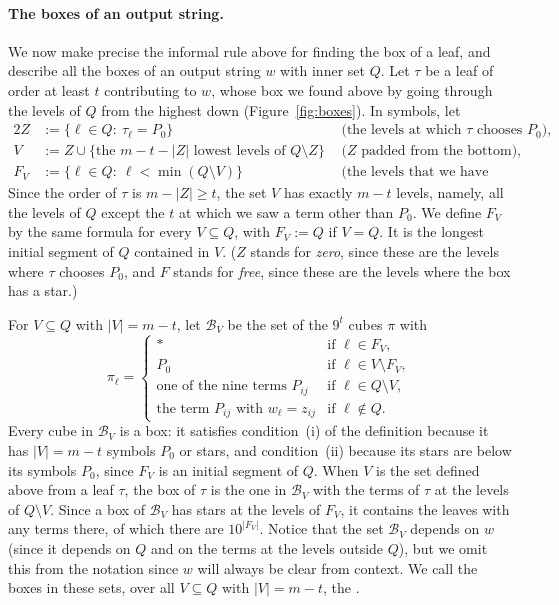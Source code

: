 \paragraph{The boxes of an output string.}
We now make precise the informal rule above for finding the box of a leaf, and describe all the boxes of an output string $w$ with inner set $Q$. Let $\tau$ be a leaf of order at least $t$ contributing to $w$, whose box we found above by going through the levels of $Q$ from the highest down (Figure~\ref{fig:boxes}). In symbols, let
\begin{alignat*}{2}
Z&:=\{\ell\in Q:\ \tau_\ell=P_0\}&\qquad&\text{(the levels at which $\tau$ chooses $P_0$),}\\
V&:=Z\cup\{\text{the $m-t-|Z|$ lowest levels of }Q\setminus Z\}&&\text{($Z$ padded from the bottom),}\\
F_V&:=\{\ell\in Q:\ \ell<\min(Q\setminus V)\}&&\text{(the levels that we have not reached).}
\end{alignat*}
Since the order of $\tau$ is $m-|Z|\ge t$, the set $V$ has exactly $m-t$ levels, namely, all the levels of $Q$ except the $t$ at which we saw a term other than $P_0$. We define $F_V$ by the same formula for every $V\subseteq Q$, with $F_V:=Q$ if $V=Q$. It is the longest initial segment of $Q$ contained in $V$. ($Z$ stands for \emph{zero}, since these are the levels where $\tau$ chooses $P_0$, and $F$ stands for \emph{free}, since these are the levels where the box has a star.)

For $V\subseteq Q$ with $|V|=m-t$, let $\mathcal B_V$ be the set of the $9^t$ cubes $\pi$ with
\[
\pi_\ell=\begin{cases}
\ast&\text{if }\ell\in F_V,\\
P_0&\text{if }\ell\in V\setminus F_V,\\
\text{one of the nine terms }P_{ij}&\text{if }\ell\in Q\setminus V,\\
\text{the term }P_{ij}\text{ with }w_\ell=z_{ij}&\text{if }\ell\notin Q.
\end{cases}
\]
Every cube in $\mathcal B_V$ is a box: it satisfies condition~(i) of the definition because it has $|V|=m-t$ symbols $P_0$ or stars, and condition~(ii) because its stars are below its symbols $P_0$, since $F_V$ is an initial segment of $Q$. When $V$ is the set defined above from a leaf $\tau$, the box of $\tau$ is the one in $\mathcal B_V$ with the terms of $\tau$ at the levels of $Q\setminus V$. Since a box of $\mathcal B_V$ has stars at the levels of $F_V$, it contains the leaves with any terms there, of which there are $10^{|F_V|}$. Notice that the set $\mathcal B_V$ depends on $w$ (since it depends on $Q$ and on the terms at the levels outside $Q$), but we omit this from the notation since $w$ will always be clear from context. We call the boxes in these sets, over all $V\subseteq Q$ with $|V|=m-t$, the .

